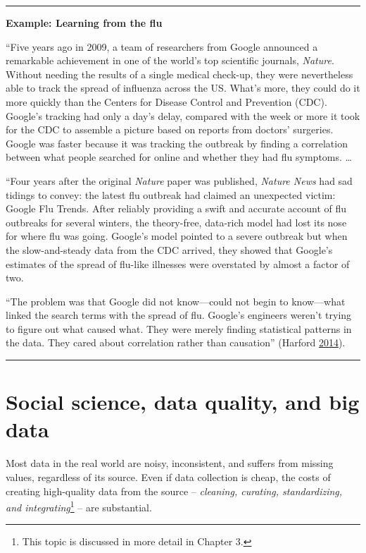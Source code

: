 \documentclass[]{krantz}
\begin{document}
\begin{center}\rule{0.5\linewidth}{\linethickness}\end{center}

\textbf{Example: Learning from the flu}

``Five years ago in 2009, a team of researchers from Google announced a
remarkable achievement in one of the world's top scientific journals,
\emph{Nature}. Without needing the results of a single medical check-up,
they were nevertheless able to track the spread of influenza across the
US. What's more, they could do it more quickly than the Centers for
Disease Control and Prevention (CDC). Google's tracking had only a day's
delay, compared with the week or more it took for the CDC to assemble a
picture based on reports from doctors' surgeries. Google was faster
because it was tracking the outbreak by finding a correlation between
what people searched for online and whether they had flu symptoms.
\ldots{}

``Four years after the original \emph{Nature} paper was published,
\emph{Nature News} had sad tidings to convey: the latest flu outbreak
had claimed an unexpected victim: Google Flu Trends. After reliably
providing a swift and accurate account of flu outbreaks for several
winters, the theory-free, data-rich model had lost its nose for where
flu was going. Google's model pointed to a severe outbreak but when the
slow-and-steady data from the CDC arrived, they showed that Google's
estimates of the spread of flu-like illnesses were overstated by almost
a factor of two.

``The problem was that Google did not know---could not begin to
know---what linked the search terms with the spread of flu. Google's
engineers weren't trying to figure out what caused what. They were
merely finding statistical patterns in the data. They cared about
correlation rather than causation'' (Harford
\protect\hyperlink{ref-harford2014big}{2014}).

\begin{center}\rule{0.5\linewidth}{\linethickness}\end{center}

\section{Social science, data quality, and big data}\label{sec:1-5}

Most data in the real world are noisy, inconsistent, and suffers from
missing values, regardless of its source. Even if data collection is
cheap, the costs of creating high-quality data from the source --
\emph{cleaning, curating, standardizing, and integrating}\footnote{This
  topic is discussed in more detail in Chapter 3.} -- are substantial.
\end{document}
